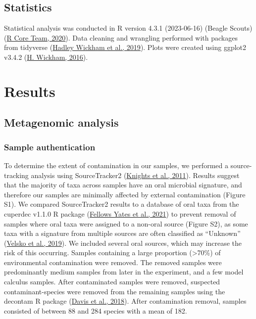 \documentclass[
  letterpaper,
]{book}
\begin{document}
\hypertarget{statistics}{%
\subsection{Statistics}\label{statistics}}

Statistical analysis was conducted in R version 4.3.1 (2023-06-16)
(Beagle Scouts) (\protect\hyperlink{ref-Rbase}{R Core Team, 2020}). Data
cleaning and wrangling performed with packages from tidyverse
(\protect\hyperlink{ref-tidyverse2019}{Hadley Wickham et al., 2019}).
Plots were created using ggplot2 v3.4.2
(\protect\hyperlink{ref-ggplot2}{H. Wickham, 2016}).

\hypertarget{results}{%
\section{Results}\label{results}}

\hypertarget{metagenomic-analysis}{%
\subsection{Metagenomic analysis}\label{metagenomic-analysis}}

\hypertarget{sample-authentication}{%
\subsubsection{Sample authentication}\label{sample-authentication}}

To determine the extent of contamination in our samples, we performed a
source-tracking analysis using SourceTracker2
(\protect\hyperlink{ref-knightsSourceTracker2011}{Knights et al.,
2011}). Results suggest that the majority of taxa across samples have an
oral microbial signature, and therefore our samples are minimally
affected by external contamination (Figure S1). We compared
SourceTracker2 results to a database of oral taxa from the cuperdec
v1.1.0 R package
(\protect\hyperlink{ref-yatesOralMicrobiome2021}{Fellows Yates et al.,
2021}) to prevent removal of samples where oral taxa were assigned to a
non-oral source (Figure S2), as some taxa with a signature from multiple
sources are often classified as ``Unknown''
(\protect\hyperlink{ref-velskoMicrobialDifferences2019}{Velsko et al.,
2019}). We included several oral sources, which may increase the risk of
this occurring. Samples containing a large proportion (\textgreater70\%)
of environmental contamination were removed. The removed samples were
predominantly medium samples from later in the experiment, and a few
model calculus samples. After contaminated samples were removed,
suspected contaminant-species were removed from the remaining samples
using the decontam R package (\protect\hyperlink{ref-Rdecontam}{Davis et
al., 2018}). After contamination removal, samples consisted of between
88 and 284 species with a mean of 182.
\end{document}
